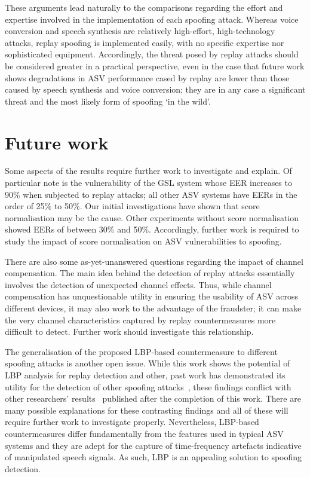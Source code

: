These arguments lead naturally to the comparisons regarding the effort and expertise involved in the implementation of each spoofing attack.  Whereas voice conversion and speech synthesis are relatively high-effort, high-technology attacks, replay spoofing is implemented easily, with no specific expertise nor sophisticated equipment.  Accordingly, the threat posed by replay attacks should be considered greater in a practical perspective, even in the case that future work shows degradations in ASV performance cased by replay are lower than those caused by speech synthesis and voice conversion; they are in any case a significant threat and the most likely form of spoofing `in the wild'.




\section{Future work}
\label{sec::future}

Some aspects of the results require further work to investigate and explain.  Of particular note is the vulnerability of the GSL system whose EER increases to 90\% when subjected to replay attacks; all other ASV systems have EERs in the order of 25\% to 50\%.  Our initial investigations have shown that score normalisation may be the cause.  Other experiments without score normalisation showed EERs of between 30\% and 50\%.  Accordingly, further work is required to study the impact of score normalisation on ASV vulnerabilities to spoofing. 

There are also some as-yet-unanswered questions regarding the impact of channel compensation.  The main idea behind the detection of replay attacks essentially involves the detection of unexpected channel effects.  Thus, while channel compensation has unquestionable utility in ensuring the usability of ASV across different devices, it may also work to the advantage of the fraudster; it can make the very channel characteristics captured by replay countermeasures more difficult to detect.  %
Further work should investigate this relationship.

The generalisation of the proposed LBP-based countermeasure to different spoofing attacks is another open issue.  While this work shows the potential of LBP analysis for replay detection and other, past work has demonstrated its utility for the detection of other spoofing attacks~\cite{Alegre2013a, AlegreBTAS2013}, these findings conflict with other researchers' results~\cite{Sahidullah2015} published after the completion of this work.  There are many possible explanations for these contrasting findings and all of these will require further work to investigate properly.  Nevertheless, LBP-based countermeasures differ fundamentally from the features used in typical ASV systems and they are adept for the capture of time-frequency artefacts indicative of manipulated speech signals.  As such, LBP is an appealing solution to spoofing detection.


